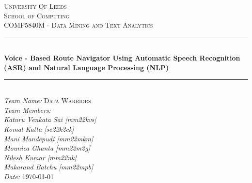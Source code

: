 \documentclass{epsrc}
\begin{document}
\begin{titlepage}

\newcommand{\HRule}{\rule{\linewidth}{0.5mm}} %

\center %
 

\textsc{\LARGE University Of Leeds}\\[1cm] %
\textsc{\Large School of Computing}\\[0.5cm] %
\textsc{\large COMP5840M - Data Mining and Text Analytics}\\[0.5cm] %


\HRule \\[0.5cm]
{ \huge \bfseries Voice - Based Route Navigator Using Automatic Speech Recognition (ASR) and Natural Language Processing (NLP)}\\[0.4cm] %
\HRule \\[2cm]
 

\Large \emph{Team Name:} \textsc{Data Warriors}\\[2cm] %
\Large \emph{Team Members:} \\
\emph{Katuru Venkata Sai [mm22kvs]}\\
\emph{Komal Katta [sc22k2ck]}\\
\emph{Mani Mandepudi [mm22mkm]}\\
\emph{Mounica Ghanta [mm22m2g]}\\
\emph{Nilesh Kumar [mm22nk]}\\
\emph{Makarand Batchu [mm22mpb]}\\[2cm]

{\large \emph{Date:} \today}\\[1cm] %

\vfill %

\end{titlepage}
\newpage
\end{document}
